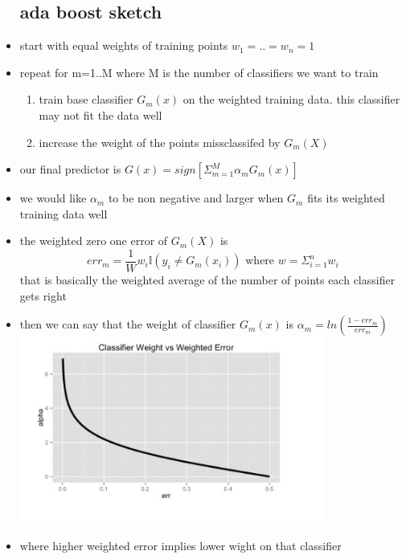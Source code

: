 \documentclass{article}
\begin{document}
\begin{itemize}
\subsection*{ada boost sketch}
\item start with equal weights of training points $w_1=..=w_n=1$
\item repeat for m=1..M where M is the number of classifiers we want to train 
\begin{enumerate}
    \item train base classifier $G_m(x)$ on the weighted training data. this classifier may not fit the data well
    \item increase the weight of the points missclassifed by $G_m(X)$
\end{enumerate}
\item our final predictor is $G(x)=sign[\Sigma_{m=1}^{M}\alpha_{m}G_m(x)]$ 
\item we would like $\alpha_{m}$ to be non negative and larger when $G_m$ fits its weighted training data well
\item the weighted zero one error of $G_m(X)$ is $$err_{m}=\frac{1}{W}w_i\mathbb{I}(y_i\neq G_m(x_i)) \text{   where } w=\Sigma_{i=1}^{n}w_i$$that is basically the weighted average of the number of points each classifier gets right 
\item then we can say that the weight of classifier $G_{m}(x)$ is $\alpha_{m}=ln(\frac{1-err_m}{err_m})$
\includegraphics[width=10cm]{lecture_notes/lecture_9/immages/l9_6.jpg}
\item where higher weighted error implies lower wight on that classifier

\end{itemize}
\end{document}
